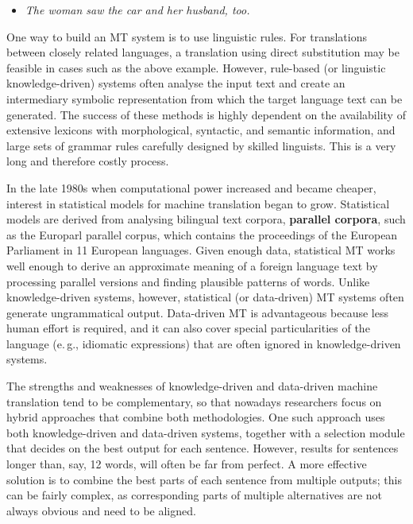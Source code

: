 \documentclass[]{../../metanetpaper}
\begin{document}
\begin{multicols}{2}
\begin{itemize}
\item {\it The woman saw the car and her husband, too.}
\end{itemize}

One way to build an MT system is to use linguistic rules. For translations between closely related languages, a translation using direct substitution may be feasible in cases such as the above example. However, rule-based (or linguistic knowledge-driven) systems often analyse the input text and create an intermediary symbolic representation from which the target language text can be generated. The success of these methods is highly dependent on the availability of extensive lexicons with morphological, syntactic, and semantic information, and large sets of grammar rules carefully designed by skilled linguists. This is a very long and therefore costly process.

In the late 1980s when computational power increased and became cheaper, interest in statistical models for machine translation began to grow. Statistical models are derived from analysing bilingual text corpora, \textbf{parallel corpora}, such as the Europarl parallel corpus, which contains the proceedings of the European Parliament in 11 European languages. Given enough data, statistical MT works well enough to derive an approximate meaning of a foreign language text by processing parallel versions and finding plausible patterns of words. Unlike knowledge-driven systems, however, statistical (or data-driven) MT systems often generate ungrammatical output. Data-driven MT is advantageous because less human effort is required, and it can also cover special particularities of the language (e.\,g., idiomatic expressions) that are often ignored in knowledge-driven systems. 

The strengths and weaknesses of knowledge-driven and data-driven machine translation tend to be complementary, so that nowadays researchers focus on hybrid approaches that combine both methodologies. One such approach uses both knowledge-driven and data-driven systems, together with a selection module that decides on the best output for each sentence. However, results for sentences longer than, say, 12 words, will often be far from perfect. A more effective solution is to combine the best parts of each sentence from multiple outputs; this can be fairly complex, as corresponding parts of multiple alternatives are not always obvious and need to be aligned. 



\end{multicols}
\end{document}
